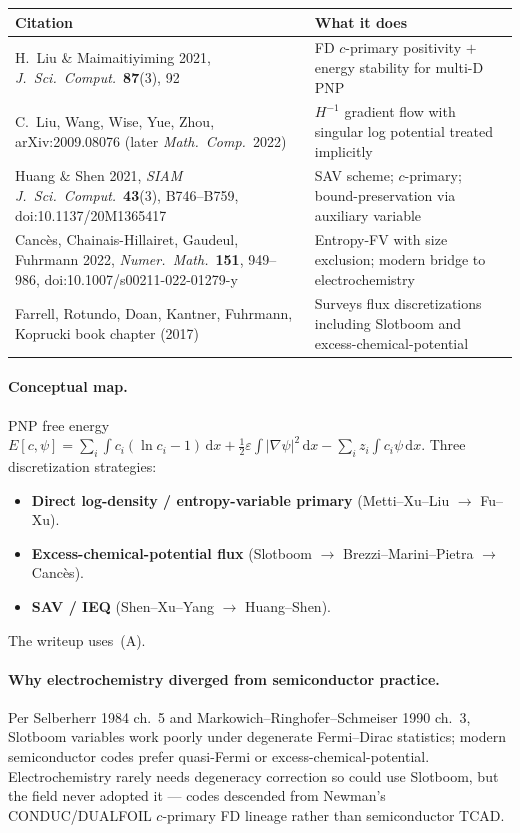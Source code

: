 \documentclass[11pt]{article}
\begin{document}
\begin{center}
\small
\begin{tabular}{@{}p{} p{}@{}}
\toprule
\textbf{Citation} & \textbf{What it does} \\
\midrule
H.~Liu \& Maimaitiyiming 2021, \emph{J.~Sci.~Comput.}\ \textbf{87}(3), 92 &
FD $c$-primary positivity $+$ energy stability for multi-D PNP \\
C.~Liu, Wang, Wise, Yue, Zhou, arXiv:2009.08076 (later \emph{Math.~Comp.}\ 2022) &
$H^{-1}$ gradient flow with singular log potential treated implicitly \\
Huang \& Shen 2021, \emph{SIAM J.~Sci.~Comput.}\ \textbf{43}(3), B746--B759,
doi:10.1137/20M1365417 &
SAV scheme; $c$-primary; bound-preservation via auxiliary variable \\
Canc\`es, Chainais-Hillairet, Gaudeul, Fuhrmann 2022,
\emph{Numer.~Math.}\ \textbf{151}, 949--986, doi:10.1007/s00211-022-01279-y &
Entropy-FV with size exclusion; modern bridge to electrochemistry \\
Farrell, Rotundo, Doan, Kantner, Fuhrmann, Koprucki book chapter (2017) &
Surveys flux discretizations including Slotboom and excess-chemical-potential \\
\bottomrule
\end{tabular}
\end{center}

\paragraph{Conceptual map.}
PNP free energy
$E[c,\psi]=\sum_i\!\int c_i(\ln c_i-1)\,\mathrm{d}x+\tfrac12\varepsilon\!\int|\nabla\psi|^2\,\mathrm{d}x-\sum_i z_i\!\int c_i\psi\,\mathrm{d}x$.
Three discretization strategies:
\begin{itemize}
\item[(A)] \textbf{Direct log-density / entropy-variable primary}
      (Metti--Xu--Liu $\to$ Fu--Xu).
\item[(B)] \textbf{Excess-chemical-potential flux} (Slotboom $\to$
      Brezzi--Marini--Pietra $\to$ Canc\`es).
\item[(C)] \textbf{SAV / IEQ} (Shen--Xu--Yang $\to$ Huang--Shen).
\end{itemize}
The writeup uses~(A).

\paragraph{Why electrochemistry diverged from semiconductor practice.}
Per Selberherr 1984 ch.~5 and Markowich--Ringhofer--Schmeiser 1990 ch.~3,
Slotboom variables work poorly under degenerate Fermi--Dirac statistics;
modern semiconductor codes prefer quasi-Fermi or excess-chemical-potential.
Electrochemistry rarely needs degeneracy correction so could use Slotboom,
but the field never adopted it --- codes descended from Newman's
CONDUC/DUALFOIL $c$-primary FD lineage rather than semiconductor TCAD.
\end{document}
